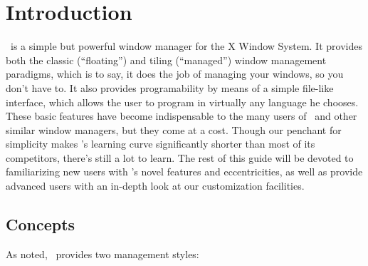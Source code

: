 \chapter{Introduction}

\wmii\ is a simple but powerful window manager for the X Window
System. It provides both the classic (“floating”) and tiling
(“managed”) window management paradigms, which is to say, it does
the job of managing your windows, so you don't have to. It also
provides programability by means of a simple file-like
interface, which allows the user to program in virtually any
language he chooses. These basic features have become
indispensable to the many users of \wmii\ and other similar
window managers, but they come at a cost. Though our penchant
for simplicity makes \wmii's learning curve significantly
shorter than most of its competitors, there's still a lot to
learn. The rest of this guide will be devoted to familiarizing
new users with \wmii's novel features and eccentricities, as
well as provide advanced users with an in-depth look at our
customization facilities.

\section{Concepts}

As noted, \wmii\ provides two management styles:

